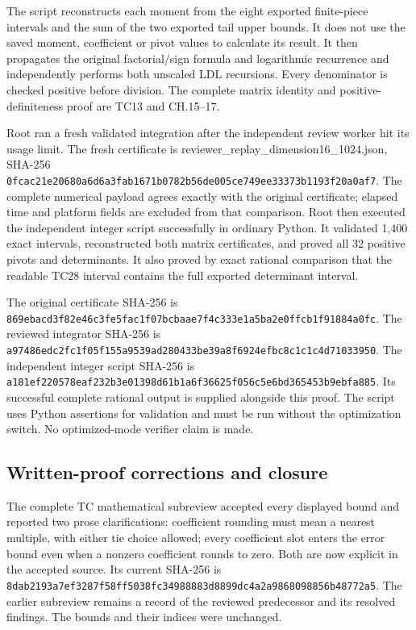 The script reconstructs each moment from the eight exported finite-piece intervals and the sum of the two exported tail upper bounds. It does not use the saved moment, coefficient or pivot values to calculate its result. It then propagates the original factorial/sign formula and logarithmic recurrence and independently performs both unscaled LDL recursions. Every denominator is checked positive before division. The complete matrix identity and positive-definiteness proof are TC13 and CH.15--17.

Root ran a fresh validated integration after the independent review worker hit its usage limit. The fresh certificate is reviewer\_replay\_dimension16\_1024.json, SHA-256 \nolinkurl{0fcac21e20680a6d6a3fab1671b0782b56de005ce749ee33373b1193f20a0af7}. The complete numerical payload agrees exactly with the original certificate; elapsed time and platform fields are excluded from that comparison. Root then executed the independent integer script successfully in ordinary Python. It validated 1,400 exact intervals, reconstructed both matrix certificates, and proved all 32 positive pivots and determinants. It also proved by exact rational comparison that the readable TC28 interval contains the full exported determinant interval.

The original certificate SHA-256 is \nolinkurl{869ebacd3f82e46c3fe5fac1f07bcbaae7f4c333e1a5ba2e0ffcb1f91884a0fc}. The reviewed integrator SHA-256 is \nolinkurl{a97486edc2fc1f05f155a9539ad280433be39a8f6924efbc8c1c1c4d71033950}. The independent integer script SHA-256 is \nolinkurl{a181ef220578eaf232b3e01398d61b1a6f36625f056c5e6bd365453b9ebfa885}. Its successful complete rational output is supplied alongside this proof. The script uses Python assertions for validation and must be run without the optimization switch. No optimized-mode verifier claim is made.

\subsection{Written-proof corrections and closure}\label{C47stage:RootAcceptance:written-proof-corrections-and-closure}

The complete TC mathematical subreview accepted every displayed bound and reported two prose clarifications: coefficient rounding must mean a nearest multiple, with either tie choice allowed; every coefficient slot enters the error bound even when a nonzero coefficient rounds to zero. Both are now explicit in the accepted source. Its current SHA-256 is \nolinkurl{8dab2193a7ef3287f58ff5038fc34988883d8899dc4a2a9868098856b48772a5}. The earlier subreview remains a record of the reviewed predecessor and its resolved findings. The bounds and their indices were unchanged.

